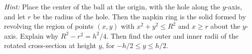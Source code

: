 \documentclass[12pt,letterpaper]{article}
\begin{document}
\begin{enumerate}[label=\textbf{\arabic*.},leftmargin=2em,itemsep=1.25em]
    \emph{Hint:} Place the center of the ball at the origin, with the hole
    along the $y$-axis, and let $r$ be the radius of the hole. Then the napkin
    ring is the solid formed by revolving the region of points $(x,y)$ with
    $x^2+y^2\le R^2$ and $x\ge r$ about the $y$-axis. Explain why
    $R^2-r^2=h^2/4$. Then find the outer and inner radii of the rotated cross-section 
    at height $y$, for $-h/2\le y\le h/2$.


\end{enumerate}
\end{document}
